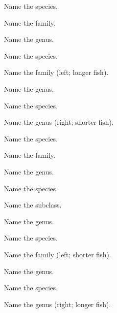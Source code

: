 \documentclass{exam}
\begin{document}
\begin{questions}
{\question Name the species.
\vspace{2\baselineskip}

\question Name the family.
\vspace{0.5\baselineskip}

\question Name the genus.
\vspace{0.5\baselineskip}

\question Name the species.
\vspace{2\baselineskip}

\question Name the family (left; longer fish).
\vspace{0.5\baselineskip}

\question Name the genus.
\vspace{0.5\baselineskip}

\question Name the species.
\vspace{0.5\baselineskip}

\question Name the genus (right; shorter fish).
\vspace{0.5\baselineskip}

\question Name the species.
\vspace{2\baselineskip}

\question Name the family.
\vspace{0.5\baselineskip}

\question Name the genus.
\vspace{0.5\baselineskip}

\question Name the species.
\vspace{2\baselineskip}
\newpage

\question Name the subclass.
\vspace{0.5\baselineskip}

\question Name the genus.
\vspace{0.5\baselineskip}

\question Name the species.
\vspace{2\baselineskip}

\question Name the family (left; shorter fish).
\vspace{0.5\baselineskip}

\question Name the genus.
\vspace{0.5\baselineskip}

\question Name the species.
\vspace{0.5\baselineskip}

\question Name the genus (right; longer fish).
\vspace{0.5\baselineskip}

}
\end{questions}
\end{document}
